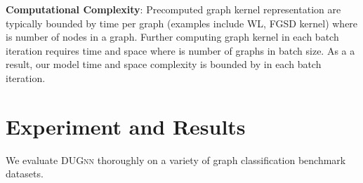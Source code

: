 \documentclass{article}
\begin{document}
\vspace{-1.5em}





\noindent \textbf{Computational Complexity}: Precomputed graph kernel representation are typically bounded by  time per graph (examples include WL, FGSD kernel) where  is number of nodes in a graph. Further computing graph kernel in each batch iteration requires   time and space  where  is number of graphs in batch size. As a a result, our model time and space complexity is bounded by  in each batch iteration. 





\section{Experiment and Results}\label{sec:exp_results}

We evaluate  \textsc{DUGnn}   thoroughly on a variety of graph classification benchmark datasets.
\end{document}
